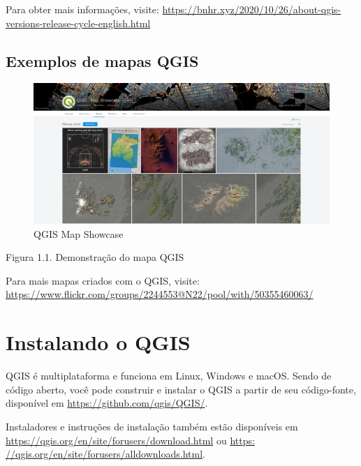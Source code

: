 \documentclass[
  portuguese,
]{krantz}
\begin{document}
Para obter mais informações, visite: \href{https://bnhr.xyz/2020/10/26/\%20about-qgis-versions-release-cycle-english.html}{https://bnhr.xyz/2020/10/26/about-qgis-versions-release-cycle-english.html}

\hypertarget{exemplos-de-mapas-qgis}{%
\subsection{\texorpdfstring{\textbf{Exemplos de mapas QGIS}}{Exemplos de mapas QGIS}}\label{exemplos-de-mapas-qgis}}

\begin{figure}
\centering
\includegraphics{media/modulo1/qgis-map-showcase.png}
\caption{QGIS Map Showcase}
\end{figure}

Figura 1.1. Demonstração do mapa QGIS

Para mais mapas criados com o QGIS, visite: \href{https://www.flickr.com/groups/2244553@N22/\%20piscina/com/50355460063/}{https://www.flickr.com/groups/2244553@N22/pool/with/50355460063/}

\hypertarget{instalando-o-qgis}{%
\section{\texorpdfstring{\textbf{Instalando o QGIS}}{Instalando o QGIS}}\label{instalando-o-qgis}}

QGIS é multiplataforma e funciona em Linux, Windows e macOS. Sendo de código aberto, você pode construir e instalar o QGIS a partir de seu código-fonte, disponível em \url{https://github.com/qgis/QGIS/}.

Instaladores e instruções de instalação também estão disponíveis em \url{https://qgis.org/en/site/forusers/download.html} ou \href{https://qgis.org/en/site/forusers/alldownloads.html}{https: //qgis.org/en/site/forusers/alldownloads.html}.
\end{document}
